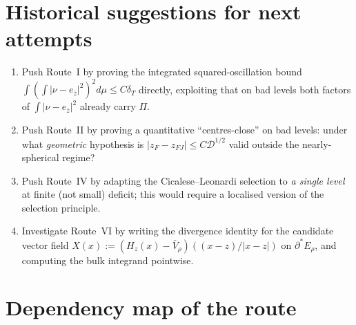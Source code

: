 \documentclass[11pt]{article}
\theoremstyle{definition}
\newcommand{\dD}{\mathcal D}
\begin{document}
\section{Historical suggestions for next attempts}\label{sec:suggestions}

\begin{enumerate}[label=(S\arabic*)]
\item Push Route~I by proving the integrated squared-oscillation
bound
$\int(\int|\nu-e_{\bar z}|^{2})^{2}d\mu\le C\delta_{T}$ directly,
exploiting that on bad levels both factors of $\int|\nu-e_{\bar z}|^{2}$
already carry $\Pi$.
\item Push Route~II by proving a quantitative ``centres-close'' on bad
levels: under what \emph{geometric} hypothesis is
$|z_{F}-z_{FJ}|\le C\dD^{1/2}$ valid outside the nearly-spherical
regime?
\item Push Route~IV by adapting the Cicalese--Leonardi selection to
\emph{a single level} at finite (not small) deficit; this would
require a localised version of the selection principle.
\item Investigate Route~VI by writing the divergence identity for the
candidate vector field
$X(x):=(H_{z}(x)-\bar V_{\rho})((x-z)/|x-z|)$ on
$\partial^{*}E_{\rho}$, and computing the bulk integrand pointwise.
\end{enumerate}

\section{Dependency map of the route}\label{sec:dep-map}
\end{document}
